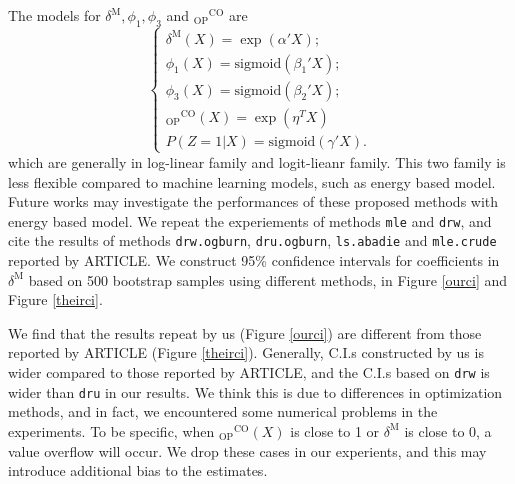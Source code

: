 \documentclass{article}
\begin{document}
The models for $\delta^\mathrm{M}, \phi_1, \phi_3$ and ${ }_{\mathrm{OP}}{ }^{\mathrm{CO}}$  are
\begin{equation}
\left\{
\begin{array}{l}
\delta^{\mathrm{M}}(X) = \exp(\alpha' X);\\
\phi_1(X) = \mathrm{sigmoid}(\beta_1' X);\\
\phi_3(X) = \mathrm{sigmoid}(\beta_2' X);\\
{ }_{\mathrm{OP}}{ }^{\mathrm{CO}}(X) = \exp(\eta^T X)\\
P(Z=1|X) = \mathrm{sigmoid}(\gamma' X).
\end{array}
\right.
\end{equation}
which are generally in log-linear family and logit-lieanr family. This two family is less flexible compared to machine learning models, such as energy based model. Future works may investigate the performances of these proposed methods with energy based model. We repeat the experiements of methods \texttt{mle} and \texttt{drw}, and cite the results of methods  \texttt{drw.ogburn},  \texttt{dru.ogburn},  \texttt{ls.abadie} and  \texttt{mle.crude} reported by ARTICLE. We construct 95\% confidence intervals for coefficients in $\delta^{\mathrm{M}}$ based on 500 bootstrap samples using different methods, in Figure \ref*{ourci} and Figure \ref*{theirci}.

We find that the results repeat by us (Figure \ref*{ourci}) are different from those reported by ARTICLE (Figure \ref*{theirci}). Generally, C.I.s constructed by us is wider compared to those reported by ARTICLE, and the C.I.s based on \texttt{drw} is wider than \texttt{dru} in our results. We think this is due to differences in optimization methods, and in fact, we encountered some numerical problems in the experiments. To be specific, when ${ }_{\mathrm{OP}}{ }^{\mathrm{CO}}(X)$ is close to 1 or $\delta^{\mathrm{M}}$ is close to 0, a value overflow will occur. We drop these cases in our experients, and this may introduce additional bias to the estimates.
\end{document}
